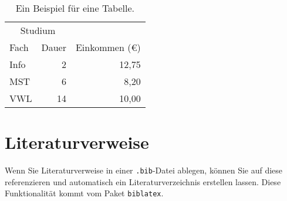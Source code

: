 		\begin{table}
			\centering
			\begin{tabular}{lrr} 
				\toprule
				\multicolumn{2}{c}{Studium}\\ \cmidrule{1-2}
				Fach & Dauer & Einkommen (\euro{})\\ 
				\midrule 
				Info & 2 & 12,75 \\ \addlinespace
				MST & 6 & 8,20 \\ \addlinespace
				VWL & 14 & 10,00\\ 
				\bottomrule
			\end{tabular}
			\caption{Ein Beispiel für eine Tabelle.}%
			\label{tab:einkommen}
		\end{table}
		
		\textcolor{gray}{\lipsum[1]}
		
	\section{Literaturverweise}
		Wenn Sie Literaturverweise in einer \texttt{.bib}-Datei ablegen, können Sie auf diese referenzieren \cite{foo1999} und automatisch ein Literaturverzeichnis erstellen lassen. Diese Funktionalität kommt vom Paket \texttt{biblatex}. %
			